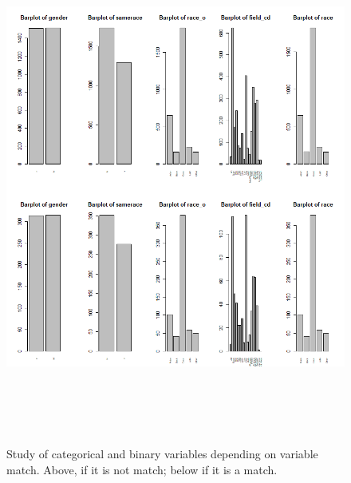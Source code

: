 \begin{figure}
  \centering
  \includegraphics[width= 16cm, height=17cm]{images/profiling/CPG_match_gender_race.png}
  \caption{Study of categorical and binary variables depending on variable match. Above, if it is not match; below if it is a match.}
  \label{fig:indiv}
\end{figure}

